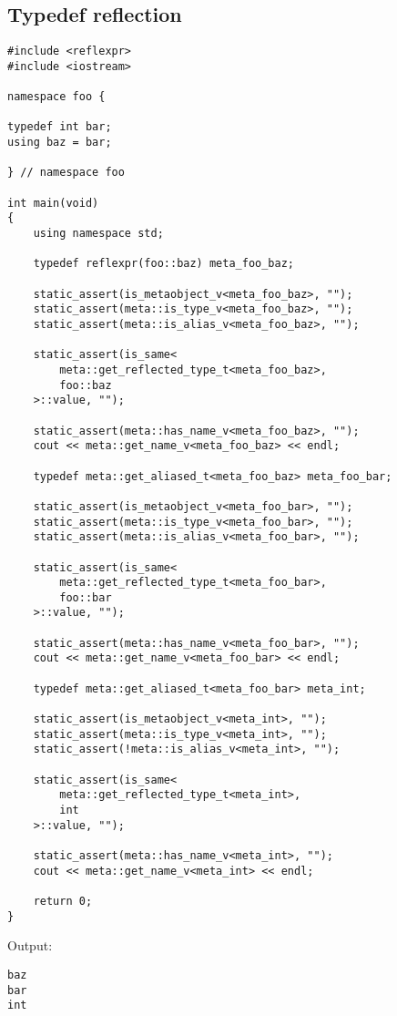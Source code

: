 \subsection{Typedef reflection}

\begin{verbatim}
#include <reflexpr>
#include <iostream>

namespace foo {

typedef int bar;
using baz = bar;

} // namespace foo

int main(void)
{
	using namespace std;

	typedef reflexpr(foo::baz) meta_foo_baz;

	static_assert(is_metaobject_v<meta_foo_baz>, "");
	static_assert(meta::is_type_v<meta_foo_baz>, "");
	static_assert(meta::is_alias_v<meta_foo_baz>, "");

	static_assert(is_same<
		meta::get_reflected_type_t<meta_foo_baz>,
		foo::baz
	>::value, "");

	static_assert(meta::has_name_v<meta_foo_baz>, "");
	cout << meta::get_name_v<meta_foo_baz> << endl;

	typedef meta::get_aliased_t<meta_foo_baz> meta_foo_bar;

	static_assert(is_metaobject_v<meta_foo_bar>, "");
	static_assert(meta::is_type_v<meta_foo_bar>, "");
	static_assert(meta::is_alias_v<meta_foo_bar>, "");

	static_assert(is_same<
		meta::get_reflected_type_t<meta_foo_bar>,
		foo::bar
	>::value, "");

	static_assert(meta::has_name_v<meta_foo_bar>, "");
	cout << meta::get_name_v<meta_foo_bar> << endl;

	typedef meta::get_aliased_t<meta_foo_bar> meta_int;

	static_assert(is_metaobject_v<meta_int>, "");
	static_assert(meta::is_type_v<meta_int>, "");
	static_assert(!meta::is_alias_v<meta_int>, "");

	static_assert(is_same<
		meta::get_reflected_type_t<meta_int>,
		int
	>::value, "");

	static_assert(meta::has_name_v<meta_int>, "");
	cout << meta::get_name_v<meta_int> << endl;

	return 0;
}

\end{verbatim}

Output:

\begin{verbatim}
baz
bar
int
\end{verbatim}

